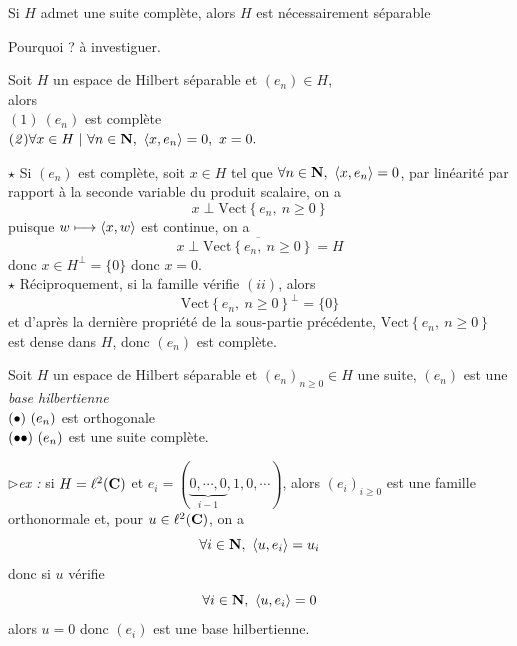 \documentclass[a4paper,11pt, twoside]{article}
\begin{document}
\begin{RQ}
  Si $H$ admet une suite complète, alors $H$ est nécessairement séparable
\end{RQ}


\begin{Proof}
  Pourquoi ? à investiguer.
\end{Proof}


\begin{prop}
  Soit $H$ un espace de Hilbert séparable et $(e_n)\in H$,\\

  alors \lasse\\
  $(\mathit 1)\ (e_n)$ est complète\\
  $(\mathit 2)\forall x\in H\TQ \forall n\in\N,\ \ps{x,e_n}=0,\ x=0.$
\end{prop}


\begin{Proof}
  $\star$ Si $(e_n)$ est complète, soit $x\in H$ tel que $\forall n\in \N,\ \ps{x,e_n}=0$, par linéarité par rapport à la seconde variable du produit scalaire, on a 
  $$x\perp\mathrm{Vect}\left\{e_n,\ n\geqslant 0\right\}$$
  puisque $w\longmapsto\left\langle x,w \right\rangle$ est continue, on a 
  $$x\perp\overline{\mathrm{Vect}\left\{e_n,\ n\geqslant 0\right\}}=H$$
  donc $x\in H^\bot=\{0\}$ donc $x=0$.\\

  $\star$ Réciproquement, si la famille vérifie $(ii)$, alors 
  $$\mathrm{Vect}\left\{e_n,\ n\geqslant 0\right\}^\bot=\{0\}$$
  et d'après la dernière propriété de la sous-partie précédente, $\mathrm{Vect}\left\{e_n,\ n\geqslant 0\right\}$ est dense dans $H$, donc $(e_n)$ est complète.
\end{Proof}


\begin{Def}
  Soit $H$ un espace de Hilbert séparable et $(e_n)_{n\geqslant 0}\in H$ une suite, $(e_n)$ est une \emph{base hilbertienne} \ssi\\
  $(\bullet)\ (e_n)$ est orthogonale\\
  $(\bullet\bullet)\ (e_n)$ est une suite complète.
\end{Def}


$\triangleright$\emph{ex : }si $H=\ell^2(\mathbf C)$ et $e_i=(\underbrace{0,\cdots,0}_{i-1},1,0,\cdots)$, alors $(e_i)_{i\geqslant 0}$ est une famille orthonormale et, pour $u\in\ell^2(\mathbf C)$, on a 
$$\forall i\in \mathbf N,\ \left\langle u,e_i \right\rangle=u_i$$
donc si $u$ vérifie 
$$\forall i\in \N,\ \ps{u,e_i}=0$$
alors $u=0$ donc $(e_i)$ est une base hilbertienne.
\end{document}
